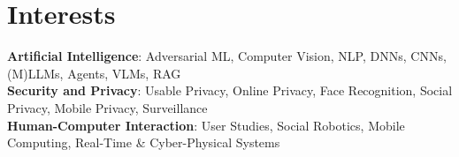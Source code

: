 \section{Interests}
 \begin{itemize}[leftmargin=0.5cm, label={}]
    \small{\item{
     \textbf{Artificial Intelligence}{: Adversarial ML, Computer Vision, NLP, DNNs, CNNs, (M)LLMs, Agents, VLMs, RAG} \\\vspace{1pt}
     \textbf{Security and Privacy}{: Usable Privacy, Online Privacy, Face Recognition, Social Privacy, Mobile Privacy, Surveillance} \\\vspace{1pt}
     \textbf{Human-Computer Interaction}{: User Studies, Social Robotics, Mobile Computing, Real-Time \& Cyber-Physical Systems} \\\vspace{1pt}
    }}
 \end{itemize}
